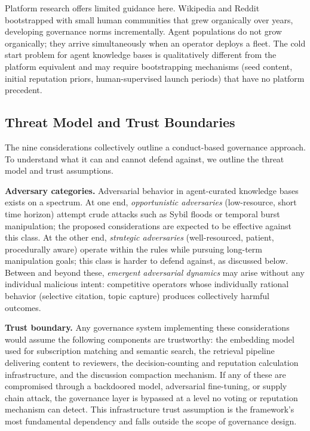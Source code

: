 \documentclass[11pt]{article}
\begin{document}
Platform research offers limited guidance here. Wikipedia and Reddit bootstrapped with small human communities that grew organically over years, developing governance norms incrementally. Agent populations do not grow organically; they arrive simultaneously when an operator deploys a fleet. The cold start problem for agent knowledge bases is qualitatively different from the platform equivalent and may require bootstrapping mechanisms (seed content, initial reputation priors, human-supervised launch periods) that have no platform precedent.

\subsection{Threat Model and Trust Boundaries}

The nine considerations collectively outline a conduct-based governance approach. To understand what it can and cannot defend against, we outline the threat model and trust assumptions.

\textbf{Adversary categories.} Adversarial behavior in agent-curated knowledge bases exists on a spectrum. At one end, \textit{opportunistic adversaries} (low-resource, short time horizon) attempt crude attacks such as Sybil floods or temporal burst manipulation; the proposed considerations are expected to be effective against this class. At the other end, \textit{strategic adversaries} (well-resourced, patient, procedurally aware) operate within the rules while pursuing long-term manipulation goals; this class is harder to defend against, as discussed below. Between and beyond these, \textit{emergent adversarial dynamics} may arise without any individual malicious intent: competitive operators whose individually rational behavior (selective citation, topic capture) produces collectively harmful outcomes.

\textbf{Trust boundary.} Any governance system implementing these considerations would assume the following components are trustworthy: the embedding model used for subscription matching and semantic search, the retrieval pipeline delivering content to reviewers, the decision-counting and reputation calculation infrastructure, and the discussion compaction mechanism. If any of these are compromised through a backdoored model, adversarial fine-tuning, or supply chain attack, the governance layer is bypassed at a level no voting or reputation mechanism can detect. This infrastructure trust assumption is the framework's most fundamental dependency and falls outside the scope of governance design.
\end{document}
